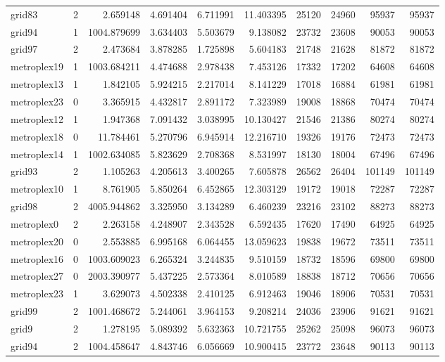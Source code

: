 \begin{longtable}{|l|r|r|r|r|r|r|r|r|r|}
grid83 & 2 & 2.659148 & 4.691404 & 6.711991 & 11.403395 & 25120 & 24960 & 95937 & 95937 \\
grid94 & 1 & 1004.879699 & 3.634403 & 5.503679 & 9.138082 & 23732 & 23608 & 90053 & 90053 \\
grid97 & 2 & 2.473684 & 3.878285 & 1.725898 & 5.604183 & 21748 & 21628 & 81872 & 81872 \\
metroplex19 & 1 & 1003.684211 & 4.474688 & 2.978438 & 7.453126 & 17332 & 17202 & 64608 & 64608 \\
metroplex13 & 1 & 1.842105 & 5.924215 & 2.217014 & 8.141229 & 17018 & 16884 & 61981 & 61981 \\
metroplex23 & 0 & 3.365915 & 4.432817 & 2.891172 & 7.323989 & 19008 & 18868 & 70474 & 70474 \\
metroplex12 & 1 & 1.947368 & 7.091432 & 3.038995 & 10.130427 & 21546 & 21386 & 80274 & 80274 \\
metroplex18 & 0 & 11.784461 & 5.270796 & 6.945914 & 12.216710 & 19326 & 19176 & 72473 & 72473 \\
metroplex14 & 1 & 1002.634085 & 5.823629 & 2.708368 & 8.531997 & 18130 & 18004 & 67496 & 67496 \\
grid93 & 2 & 1.105263 & 4.205613 & 3.400265 & 7.605878 & 26562 & 26404 & 101149 & 101149 \\
metroplex10 & 1 & 8.761905 & 5.850264 & 6.452865 & 12.303129 & 19172 & 19018 & 72287 & 72287 \\
grid98 & 2 & 4005.944862 & 3.325950 & 3.134289 & 6.460239 & 23216 & 23102 & 88273 & 88273 \\
metroplex0 & 2 & 2.263158 & 4.248907 & 2.343528 & 6.592435 & 17620 & 17490 & 64925 & 64925 \\
metroplex20 & 0 & 2.553885 & 6.995168 & 6.064455 & 13.059623 & 19838 & 19672 & 73511 & 73511 \\
metroplex16 & 0 & 1003.609023 & 6.265324 & 3.244835 & 9.510159 & 18732 & 18596 & 69800 & 69800 \\
metroplex27 & 0 & 2003.390977 & 5.437225 & 2.573364 & 8.010589 & 18838 & 18712 & 70656 & 70656 \\
metroplex23 & 1 & 3.629073 & 4.502338 & 2.410125 & 6.912463 & 19046 & 18906 & 70531 & 70531 \\
grid99 & 2 & 1001.468672 & 5.244061 & 3.964153 & 9.208214 & 24036 & 23906 & 91621 & 91621 \\
grid9 & 2 & 1.278195 & 5.089392 & 5.632363 & 10.721755 & 25262 & 25098 & 96073 & 96073 \\
grid94 & 2 & 1004.458647 & 4.843746 & 6.056669 & 10.900415 & 23772 & 23648 & 90113 & 90113 \\

\end{longtable}
